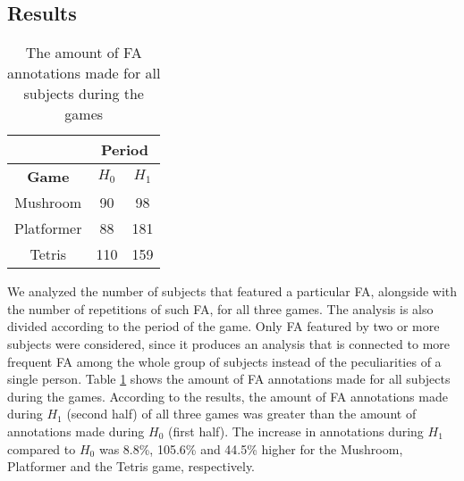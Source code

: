 \subsection{Results}

\begin{table}[!t]
\renewcommand{\arraystretch}{1.3}
\caption{The amount of FA annotations made for all subjects during the games}
\label{table:amount-fa}
\centering
\begin{tabular}{|c|c|c|}
\cline{2-3}
\multicolumn{1}{c|}{} & \multicolumn{2}{|c|}{\textbf{Period}} \\
\hline
\textbf{Game} & $H_0$ & $H_1$ \\
\hline
Mushroom   & 90 & 98 \\
\hline
Platformer & 88 & 181 \\
\hline
Tetris     & 110 & 159 \\
\hline
\end{tabular}
\end{table}

We analyzed the number of subjects that featured a particular FA, alongside with the number of repetitions of such FA, for all three games. The analysis is also divided according to the period of the game. Only FA featured by two or more subjects were considered, since it produces an analysis that is connected to more frequent FA among the whole group of subjects instead of the peculiarities of a single person. Table \ref{table:amount-fa} shows the amount of FA annotations made for all subjects during the games. According to the results, the amount of FA annotations made during $H_1$ (second half) of all three games was greater than the amount of annotations made during $H_0$ (first half). The increase in annotations during $H_1$ compared to $H_0$ was 8.8\%, 105.6\% and 44.5\% higher for the Mushroom, Platformer and the Tetris game, respectively.

